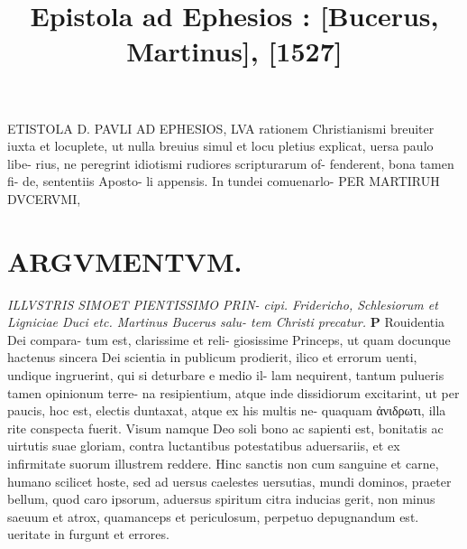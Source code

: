 \documentclass{article}
\begin{document}
\date{}
        \title{ Epistola ad Ephesios : [Bucerus, Martinus], [1527]}
\maketitle

\begin{pages} 
\beginnumbering
        ETISTOLA D. PAVLI AD EPHESIOS, LVA rationem Christianismi breuiter iuxta et locuplete, ut nulla breuius simul et locu pletius explicat, uersa paulo libe- rius, ne peregrint idiotismi rudiores scripturarum of- fenderent, bona tamen fi- de, sententiis Aposto- li appensis. In tundei comuenarlo- PER MARTIRUH DVCERVMI, 
\section*{ARGVMENTVM.  }
\textit{ILLVSTRIS SIMOET PIENTISSIMO PRIN- cipi.  Fridericho, Schlesiorum et Ligniciae Duci etc. Martinus Bucerus salu- tem Christi precatur. }
\textbf{P }\pstart Rouidentia Dei compara- tum est, clarissime et reli- giosissime Princeps, ut quam docunque hactenus sincera Dei scientia in publicum prodierit, ilico et errorum uenti, undique ingruerint, qui si deturbare e medio il- lam nequirent, tantum pulueris tamen opinionum terre- na resipientium, atque inde dissidiorum excitarint, ut per paucis, hoc est, electis duntaxat, atque ex his multis ne- quaquam ἀνιδρωτι, illa rite conspecta fuerit. Visum namque Deo soli bono ac sapienti est, bonitatis ac uirtutis suae gloriam, contra luctantibus potestatibus aduersariis, et ex infirmitate suorum illustrem reddere. Hinc sanctis non cum sanguine et carne, humano scilicet hoste, sed ad uersus caelestes uersutias, mundi dominos, praeter bellum, quod caro ipsorum, aduersus spiritum citra inducias gerit, non minus saeuum et atrox, quamanceps et periculosum, perpetuo depugnandum est.   \pendProdeunte ueritate in furgunt et errores. 

\end{pages}
\end{document}
